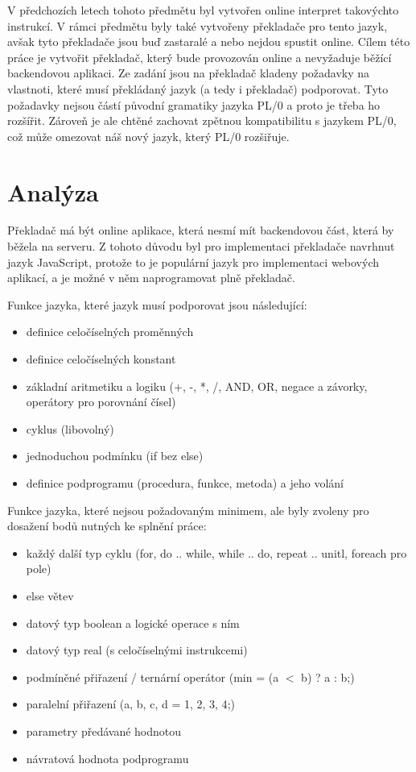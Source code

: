 \documentclass[12pt, letterpaper]{article}
\begin{document}
V předchozích letech tohoto předmětu byl vytvořen online interpret takovýchto instrukcí. V rámci předmětu byly také 
vytvořeny překladače pro tento jazyk, avšak tyto překladače jsou buď zastaralé a nebo nejdou spustit online. Cílem 
této práce je vytvořit překladač, který bude provozován online a nevyžaduje běžící backendovou aplikaci. Ze zadání
jsou na překladač kladeny požadavky na vlastnoti, které musí překládaný jazyk (a tedy i překladač) podporovat. Tyto 
požadavky nejsou částí původní gramatiky jazyka PL/0 a proto je třeba ho rozšířit. Zároveň je ale chtěné zachovat
zpětnou kompatibilitu s jazykem PL/0, což může omezovat náš nový jazyk, který PL/0 rozšiřuje.
%
\section{Analýza}
Překladač má být online aplikace, která nesmí mít backendovou část, která by běžela na serveru. Z tohoto důvodu byl
pro implementaci překladače navrhnut jazyk JavaScript, protože to je populární jazyk pro implementaci webových aplikací,
a je možné v něm naprogramovat plně  překladač.

\hfill \break
\noindent Funkce jazyka, které jazyk musí podporovat jsou následující:
%
\begin{itemize}
    \item definice celočíselných proměnných
    \item definice celočíselných konstant
    \item základní aritmetiku a logiku (+, -, *, /, AND, OR, negace a závorky, operátory pro porovnání čísel)
    \item cyklus (libovolný)
    \item jednoduchou podmínku (if bez else)
    \item definice podprogramu (procedura, funkce, metoda) a jeho volání
\end{itemize}
%
\noindent Funkce jazyka, které nejsou požadovaným minimem, ale byly zvoleny pro dosažení bodů nutných ke splnění práce:
%
\begin{itemize}
    \item každý další typ cyklu (for, do .. while, while .. do, repeat .. unitl, foreach pro pole)
    \item else větev
    \item datový typ boolean a logické operace s ním
    \item datový typ real (s celočíselnými instrukcemi)
    \item podmíněné přiřazení / ternární operátor (min = (a $<$ b) ? a : b;)
    \item paralelní přiřazení ({a, b, c, d} = {1, 2, 3, 4};)
    \item parametry předávané hodnotou
    \item návratová hodnota podprogramu
\end{itemize}
\end{document}
